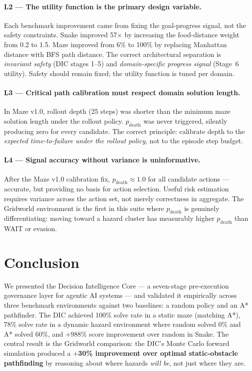 \documentclass[11pt,letterpaper]{article}
\begin{document}
\paragraph{L2 --- The utility function is the primary design variable.}
Each benchmark improvement came from fixing the goal-progress signal, not the
safety constraints. Snake improved 57$\times$ by increasing the food-distance
weight from 0.2 to 1.5. Maze improved from 6\% to 100\% by replacing Manhattan
distance with BFS path distance. The correct architectural separation is
\textit{invariant safety} (DIC stages 1--5) and \textit{domain-specific progress
signal} (Stage~6 utility). Safety should remain fixed; the utility function is
tuned per domain.

\paragraph{L3 --- Critical path calibration must respect domain solution length.}
In Maze v1.0, rollout depth (25 steps) was shorter than the minimum maze solution
length under the rollout policy. $p_{\mathrm{death}}$ was never triggered,
silently producing zero for every candidate. The correct principle: calibrate
depth to the \textit{expected time-to-failure under the rollout policy}, not to
the episode step budget.

\paragraph{L4 --- Signal accuracy without variance is uninformative.}
After the Maze v1.0 calibration fix, $p_{\mathrm{death}} \approx 1.0$ for all
candidate actions --- accurate, but providing no basis for action selection. Useful
risk estimation requires variance across the action set, not merely correctness in
aggregate. The Gridworld environment is the first in this suite where
$p_{\mathrm{death}}$ is genuinely differentiating: moving toward a hazard cluster
has measurably higher $p_{\mathrm{death}}$ than WAIT or evasion.

\section{Conclusion}
\label{sec:conclusion}

We presented the Decision Intelligence Core --- a seven-stage pre-execution
governance layer for agentic AI systems --- and validated it empirically across
three benchmark environments against two baselines: a random policy and an A*
pathfinder. The DIC achieved 100\% solve rate in a static maze (matching A*),
78\% solve rate in a dynamic hazard environment where random solved 0\% and A*
solved 60\%, and $+$988\% score improvement over random in Snake. The central
result is the Gridworld comparison: the DIC's Monte Carlo forward simulation
produced a \textbf{$+$30\% improvement over optimal static-obstacle pathfinding}
by reasoning about where hazards \textit{will be}, not just where they are.
\end{document}
